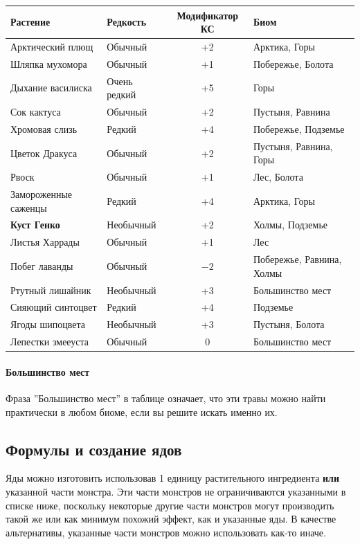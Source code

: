 \documentclass[a4paper, 9pt, twocolumn]{book}
\begin{document}
	\begin{tabular}{|l|l|c|l|}
		\hline
		\textbf{Растение} & \textbf{Редкость} & \textbf{Модификатор КС} & \textbf{Биом} \\
		\hline
		Арктический плющ & Обычный & +2 & Арктика, Горы \\
		\hline
		Шляпка мухомора & Обычный & +1 & Побережье, Болота \\
		\hline
		Дыхание василиска & Очень редкий & +5 & Горы \\
		\hline
		Сок кактуса & Обычный & +2 & Пустыня, Равнина \\
		\hline
		Хромовая слизь & Редкий & +4 & Побережье, Подземье \\
		\hline
		Цветок Дракуса & Обычный & +2 & Пустыня, Равнина, Горы \\
		\hline
		Рвоск & Обычный & +1 & Лес, Болота \\
		\hline
		Замороженные саженцы & Редкий & +4 & Арктика, Горы \\
		\hline
		\textbf{Куст Генко} & Необычный & +2 & Холмы, Подземье \\
		\hline
		Листья Харрады & Обычный & +1 & Лес \\
		\hline
		Побег лаванды & Обычный & $-2$ & Побережье, Равнина, Холмы \\
		\hline
		Ртутный лишайник & Необычный & +3 & Большинство мест \\
		\hline
		Сияющий синтоцвет & Редкий & +4 & Подземье \\
		\hline
		Ягоды шипоцвета & Необычный & +3 & Пустыня, Болота \\
		\hline
		Лепестки змееуста & Обычный & 0 & Большинство мест \\
		\hline
	\end{tabular}
	
	\paragraph*{Большинство мест}
	
	Фраза ''Большинство мест'' в таблице означает, что эти травы можно найти практически в любом биоме, если вы решите искать именно их.
	
	\subsection{Формулы и создание ядов}
	
	Яды можно изготовить использовав 1 единицу растительного ингредиента \textbf{или} указанной части монстра. Эти части монстров не ограничиваются указанными в списке ниже, поскольку некоторые другие части монстров могут производить такой же или как минимум похожий эффект, как и указанные яды. В качестве альтернативы, указанные части монстров можно использовать как-то иначе.
	
\end{document}
